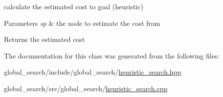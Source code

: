 calculate the estimated cost to goal (heuristic) 


\begin{DoxyParams}{Parameters}
{\em sp} & the node to estimate the cost from \\
\hline
\end{DoxyParams}
\begin{DoxyReturn}{Returns}
the estimated cost 
\end{DoxyReturn}


The documentation for this class was generated from the following files\+:\begin{DoxyCompactItemize}
\item 
global\+\_\+search/include/global\+\_\+search/\hyperlink{heuristic__search_8hpp}{heuristic\+\_\+search.\+hpp}\item 
global\+\_\+search/src/global\+\_\+search/\hyperlink{heuristic__search_8cpp}{heuristic\+\_\+search.\+cpp}\end{DoxyCompactItemize}
